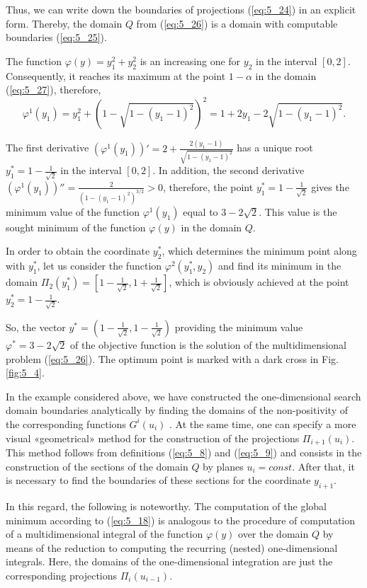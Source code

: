 \begin{example}
Thus, we can write down the boundaries of projections (\ref{eq:5_24}) in an explicit form. Thereby, the domain $Q$ from (\ref{eq:5_26}) is a domain with computable boundaries (\ref{eq:5_25}).

The function $\varphi(y)=y_1^2+y_2^2$  is an increasing one for $y_2$  in the interval $[0,2]$. Consequently, it reaches its maximum at the point $1-\alpha$  in the domain (\ref{eq:5_27}), therefore,
\begin{displaymath}
\varphi^1(y_1)=y_1^2+(1-\sqrt{1-(y_1-1)^2})^2=1+2y_1-2\sqrt{1-(y_1-1)^2}.
\end{displaymath}

The first derivative $(\varphi^1(y_1))'=2+\frac{2(y_1-1)}{\sqrt{1-(y_1-1)^2}}$ has a unique root  $y_1^*=1-\frac{1}{\sqrt{2}}$ in the interval  $[0,2]$. 
In addition, the second derivative $(\varphi^1(y_1))''=\frac{2}{(1-(y_1-1)^2)^{3/2}}>0$, therefore, the point $y_1^*=1-\frac{1}{\sqrt{2}}$  gives the minimum value of the function $\varphi^1(y_1)$  equal to $3-2\sqrt{2}$. This value is the sought minimum of the function $\varphi(y)$ in the domain $Q$. 

In order to obtain the coordinate $y_2^*$, which determines the minimum point along with $y_1^*$, let us consider the function $\varphi^2(y_1^*,y_2)$ and find its minimum in the domain $\Pi_2(y_1^*)=[1-\frac{1}{\sqrt{2}},1+\frac{1}{\sqrt{2}}]$, which is obviously achieved at the point $y_2^*=1-\frac{1}{\sqrt{2}}$.

So, the vector $y^*=(1-\frac{1}{\sqrt{2}},1-\frac{1}{\sqrt{2}})$  providing the minimum value $\varphi^*=3-2\sqrt{2}$ of the objective function is the solution of the multidimensional problem (\ref{eq:5_26}). The optimum point is marked with a dark cross in Fig. \ref{fig:5_4}. 
\end{example}

In the example considered above, we have constructed the one-dimensional search domain boundaries  analytically by finding the domains of the non-positivity of the corresponding functions $G^i(u_i)$ . At the same time, one can specify a more visual «geometrical» method for the construction of the projections $\Pi_{i+1}(u_i)$. This method follows from definitions (\ref{eq:5_8}) and (\ref{eq:5_9}) and consists in the construction of the sections of the domain $Q$  by planes $u_i=const$. After that, it is necessary to find the boundaries of these sections for the coordinate $y_{i+1}$.

In this regard, the following is noteworthy. The computation of the global minimum according to (\ref{eq:5_18}) is analogous to the procedure of computation of a multidimensional integral of the function $\varphi(y)$ over the domain $Q$ by means of the reduction to computing  the recurring (nested) one-dimensional integrals. Here, the domains of the one-dimensional integration are just the corresponding projections $\Pi_i(u_{i-1})$.

